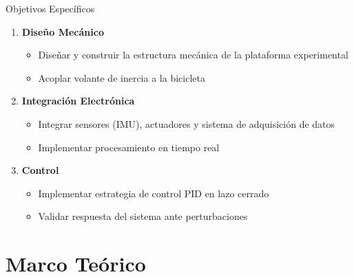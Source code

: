 \documentclass[10pt,xcolor={dvipsnames}]{beamer}
\begin{document}
\begin{frame}{Objetivos Específicos}
\begin{enumerate}
    \item \textbf{Diseño Mecánico}
    \begin{itemize}
        \item Diseñar y construir la estructura mecánica de la plataforma experimental
        \item Acoplar volante de inercia a la bicicleta
    \end{itemize}
    
    \vspace{0.2cm}
    \item \textbf{Integración Electrónica}
    \begin{itemize}
        \item Integrar sensores (IMU), actuadores y sistema de adquisición de datos
        \item Implementar procesamiento en tiempo real
    \end{itemize}
    
    \vspace{0.2cm}
    \item \textbf{Control}
    \begin{itemize}
        \item Implementar estrategia de control PID en lazo cerrado
        \item Validar respuesta del sistema ante perturbaciones
    \end{itemize}
\end{enumerate}
\end{frame}

\section{Marco Teórico}
\end{document}
